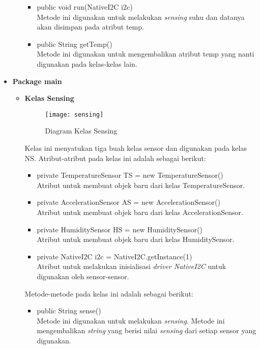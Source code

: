 \begin{itemize}
\begin{itemize}
\begin{itemize}
            \item public void run(NativeI2C i2c)\\
            Metode ini digunakan untuk melakukan \textit{sensing} suhu dan datanya akan disimpan pada atribut temp.
            \item public String getTemp()\\
            Metode ini digunakan untuk mengembalikan atribut temp yang nanti digunakan pada kelas-kelas lain.
        \end{itemize}
    \end{itemize}
    \item \textbf{Package main}
    \begin{itemize}
        \item \textbf{Kelas Sensing}\\
        \begin{figure}[h]
        	\centering
        	\texttt{[image: sensing]}
        	\caption{Diagram Kelas Sensing}
        	\label{fig:sensing}
        \end{figure}
        Kelas ini menyatukan tiga buah kelas sensor dan digunakan pada kelas NS. Atribut-atribut pada kelas ini adalah sebagai berikut:
        \begin{itemize}
            \item private TemperatureSensor TS = new TemperatureSensor()\\
            Atribut untuk membuat objek baru dari kelas TemperatureSensor.
            \item private AccelerationSensor AS = new AccelerationSensor()\\
            Atribut untuk membuat objek baru dari kelas AccelerationSensor.
            \item private HumiditySensor HS = new HumiditySensor()\\
            Atribut untuk membuat objek baru dari kelas HumiditySensor.
            \item private NativeI2C i2c = NativeI2C.getInstance(1)\\
            Atribut untuk melakukan inisialisasi \textit{driver NativeI2C} untuk digunakan oleh sensor-sensor.
        \end{itemize}
        Metode-metode pada kelas ini adalah sebagai berikut:
        \begin{itemize}
            \item public String sense()\\
            Metode ini digunakan untuk melakukan \textit{sensing}. Metode ini mengembalikan \textit{string} yang berisi nilai \textit{sensing} dari setiap sensor yang digunakan.

\end{itemize}
\end{itemize}
\end{itemize}
